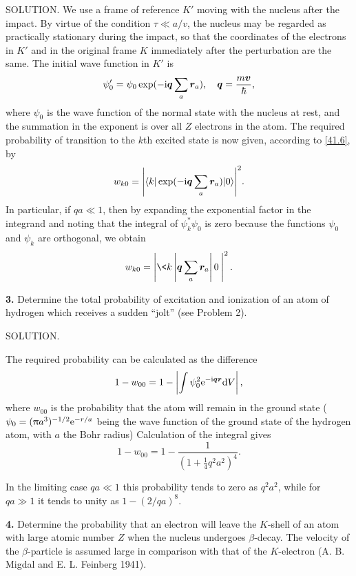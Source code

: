 {SOLUTION. We use a frame of reference $ K' $ moving with the nucleus after the impact. By virtue of the condition $ \tau\ll a/v $, the nucleus may be regarded as practically stationary during the impact, so that the coordinates of the electrons in $ K' $ and in the original frame $ K $ immediately after the perturbation are the same. The initial wave function in $ K' $ is
\[ \psi_0'=\psi_0\exp(-\mathrm{i}\bm{q}\sum_a\bm{r}_a ),\quad\bm{q}=\frac{m\bm{v}}{\hbar}, \]
where $\psi_0$ is the wave function of the normal state with the nucleus at rest, and the summation in the exponent is over all $ Z $ electrons in the atom. The required probability of transition to the $ k $th excited state is now given, according to \eqref{41.6}, by
\[ w_{k0}={\left\vert\langle k|\exp(-\mathrm{i}\bm{q}\sum_a\bm{r}_a )|0\rangle \right\vert}^2. \]
In particular, if $ qa\ll1 $, then by expanding the exponential factor in the integrand and noting that the integral of $ \psi_k^*\psi_0 $ is zero because the functions $ \psi_0 $ and $ \psi_k $ are orthogonal, we obtain
\[ w_{k0}=\left|\<k\left|\bm{q}\sum_a\bm{r}_a\right|0\> \right|^2. \]




\textbf{3.} Determine the total probability of excitation and ionization of an atom of hydrogen which receives a sudden “jolt” (see Problem 2).





SOLUTION.


The required probability can be calculated as the difference
\[ 1-w_{00}=1-\left|\int \psi^2_0\mathrm{e}^{-\mathrm{i}\bm{q}\bm{r}}\mathrm{d} V \right| ,\]
where $ w_{00} $ is the probability that the atom will remain in the ground state ($ \psi_0 = (\uppi a^3)^{-1/2}\mathrm{e}^{-r/a} $ being the wave function of the ground state of the hydrogen atom, with $ a $ the Bohr radius) Calculation of the integral gives
\[ 1-w_{00}=1-\frac{1}{(1+\frac{1}{4}q^2a^2)^4} .\]



In the limiting case $ qa\ll 1 $ this probability tends to zero as $ q^2a^2 $, while for $ qa\gg 1 $ it tends to unity as $ 1 - (2/qa)^8 $.





\textbf{4.} Determine the probability that an electron will leave the $ K $-shell of an atom with large atomic number $ Z $ when the nucleus undergoes $\beta$-decay. The velocity of the $\beta$-particle is assumed large in comparison with that of the $ K $-electron (A. B. Migdal and E. L. Feinberg 1941).





}
